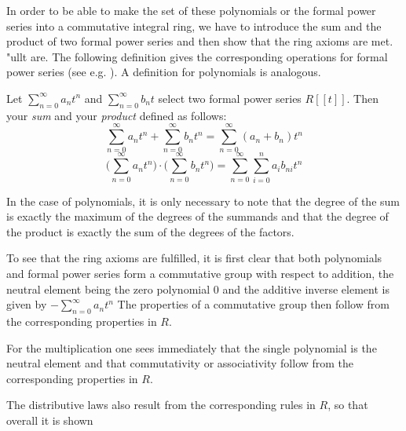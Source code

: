 In order to be able to make the set of these polynomials or the formal power series into a commutative integral ring, we have to introduce the sum and the product of two formal power series and then show that the ring axioms are met. "ullt are. The following definition gives the corresponding operations for formal power series
(see e.g. \cite{LK}). A definition for polynomials is analogous.
\begin{definition} Let $ \sum _{n = 0} ^{\infty}{a} _{n}{t} ^{n} $ and
$ \sum _{n = 0} ^{\infty}{b} _{n}{t} $ select two formal power series
$ R [[t]] $. Then your \textit{sum} and your \textit{product}
defined as follows:
\begin{equation}
\sum _{n = 0} ^{\infty}{a} _{n}{t} ^{n} + \sum _{n = 0} ^{\infty}{b} _{n}{t } ^{n} = \sum _{n = 0} ^{\infty}{({a} _{n} +{b} _{n})}{t} ^{n}
\end{equation}
\begin{equation}
\bigg (\sum _{n = 0} ^{\infty}{a} _{n}{t} ^{n} \bigg) \cdot \bigg (\sum _{n = 0} ^{\infty }{b} _{n}{t} ^{n} \bigg) = \sum _{n = 0} ^{\infty} \sum _{i = 0} ^{n}{a} _{i }{{b} _{ni}}{t} ^{n}
\end{equation}
\end{definition}
In the case of polynomials, it is only necessary to note that the degree of the sum is exactly the maximum of the degrees of the summands and that the degree of the product is exactly the sum of the degrees of the factors.

To see that the ring axioms are fulfilled, it is first clear that both polynomials and formal power series form a commutative group with respect to addition, the neutral element being the zero polynomial $ 0 $ and the additive inverse element is given by $ - \sum_{n = 0} ^ \infty a_n t ^ n $ The properties of a commutative group then follow from the corresponding properties in $ R $.

For the multiplication one sees immediately that the single polynomial is the neutral element and that commutativity or associativity follow from the corresponding properties in $ R $.

The distributive laws also result from the corresponding rules in $ R $, so that overall it is shown


